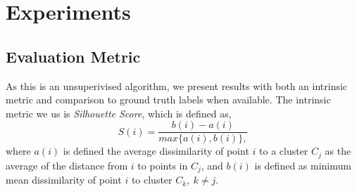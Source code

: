 \documentclass[0-main.tex]{subfiles}
\begin{document}
\section{Experiments}

\begin{table}[t!]
\centering
\caption{We evaluate the visual featurization techniques using one of our experimental datasets. The table shows the silhouette score $[-1,1]$ for each of the techniques and dimensionality reduction schemes. We found that PCA (100 dims) applied to VGG conv5\_3 gave the tightest clusters.}
\label{tab:visual}
\vspace{-15pt}
\end{table}



\subsection{Evaluation Metric}
As this is an unsuperivised algorithm, we present results with both an intrinsic metric and comparison to ground truth labels when available.
The intrinsic metric we us is \textit{Silhouette Score}, which is defined as,  \vspace{-5pt}
\[ S(i) = \frac{b(i) - a(i)}{max\{a(i), b(i)\},}
\]
where $a(i)$ is defined the average dissimilarity of point $i$ to a cluster $C_j$ as the average of the distance from $i$ to points in $C_j$, and $b(i)$ is defined as minimum mean dissimilarity of point $i$ to cluster $C_k,\ k\neq j$. 
\end{document}
